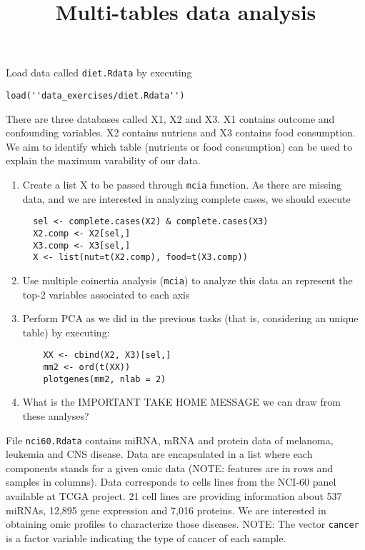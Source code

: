 \documentclass[11pt]{article}
\begin{document}
\title{\bf Multi-tables data analysis}
\date{}


\maketitle




 Load data called {\tt diet.Rdata} by executing 

\begin{verbatim}
load(''data_exercises/diet.Rdata'')
\end{verbatim}

There are three databases called X1, X2 and X3. X1 contains outcome and confounding variables. X2 contains nutriens and X3 contains food consumption. We aim to identify which table (nutrients or food consumption) can be used to explain the maximum varability of our data. 

\begin{enumerate}
 \item Create a list X to be passed through {\tt mcia} function. As there are missing data, and we are interested in analyzing complete cases, we should execute
 \begin{verbatim}
  sel <- complete.cases(X2) & complete.cases(X3)
  X2.comp <- X2[sel,]
  X3.comp <- X3[sel,]
  X <- list(nut=t(X2.comp), food=t(X3.comp))
 \end{verbatim}

 \item Use multiple coinertia analysis ({\tt mcia}) to analyze this data an represent the top-2 variables associated to each axis
 \item Perform PCA as we did in the previous tasks (that is, considering an unique table) by executing:
  \begin{verbatim}
    XX <- cbind(X2, X3)[sel,]
    mm2 <- ord(t(XX))
    plotgenes(mm2, nlab = 2)
  \end{verbatim}
 \item What is the IMPORTANT TAKE HOME MESSAGE we can draw from these analyses? 
 
\end{enumerate}


\bigskip

 File {\tt nci60.Rdata} contains miRNA, mRNA and protein data of melanoma, leukemia and CNS disease. Data are encapsulated in a list where each components stands for a given omic data (NOTE: features are in rows and samples in columns). Data corresponds to cells lines from the NCI-60 panel available at TCGA project. 21 cell lines are providing information about 537 miRNAs, 12,895 gene expression and 7,016 proteins. We are interested in obtaining omic profiles to characterize those diseases. NOTE: The vector {\tt cancer} is a factor variable indicating  the type of cancer of each sample.  
\end{document}

